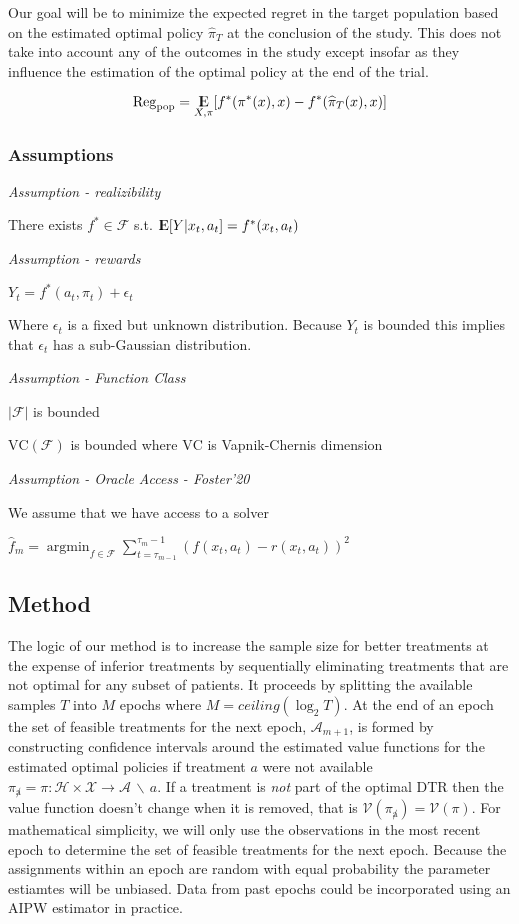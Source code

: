 \documentclass[12pt,,letterpaper,twoside]{report}
\DeclareMathOperator{\E}{{\rm I\kern-.3em E}}
\DeclareMathOperator*{\argmin}{argmin}
\begin{document}
Our goal will be to minimize the expected regret in the target
population based on the estimated optimal policy \(\widehat{\pi}_T\) at
the conclusion of the study. This does not take into account any of the
outcomes in the study except insofar as they influence the estimation of
the optimal policy at the end of the trial.

\[\mathrm{Reg}_{\text{pop}} = \E_{X, \pi}[f^*(\pi^*(x), x) - f^*(\widehat{\pi}_T(x), x)]\]

\hypertarget{assumptions}{%
\subsubsection{Assumptions}\label{assumptions}}

\emph{Assumption - realizibility}

There exists \(f^* \in \mathcal{F}\) s.t.
\(\E[Y | x_t, a_t] = f^*(x_t, a_t)\)

\emph{Assumption - rewards}

\(Y_t = f^*(a_t, \pi_t) + \epsilon_t\)

Where \(\epsilon_t\) is a fixed but unknown distribution. Because
\(Y_t\) is bounded this implies that \(\epsilon_t\) has a sub-Gaussian
distribution.

\emph{Assumption - Function Class}

\(|\mathcal{F}|\) is bounded

\(\mathrm{VC}(\mathcal{F})\) is bounded where \(\mathrm{VC}\) is
Vapnik-Chernis dimension

\emph{Assumption - Oracle Access - Foster'20}

We assume that we have access to a solver

\(\widehat{f}_m = \argmin_{f \in \mathcal{F}} \sum_{t = \tau_{m-1}}^{\tau_m - 1} \left(f(x_t, a_t) - r(x_t, a_t) \right)^2\)

\hypertarget{method}{%
\subsection{Method}\label{method}}

The logic of our method is to increase the sample size for better
treatments at the expense of inferior treatments by sequentially
eliminating treatments that are not optimal for any subset of patients.
It proceeds by splitting the available samples \(T\) into \(M\) epochs
where \(M = ceiling(\log_2{T})\). At the end of an epoch the set of
feasible treatments for the next epoch, \(\mathcal{A}_{m + 1}\), is
formed by constructing confidence intervals around the estimated value
functions for the estimated optimal policies if treatment \(a\) were not
available
\(\pi_{\not a} = \pi: \mathcal{H} \times \mathcal{X} \to \mathcal{A} \, \backslash \, a\).
If a treatment is \emph{not} part of the optimal DTR then the value
function doesn't change when it is removed, that is
\(\mathcal{V}(\pi_{\not a}) = \mathcal{V}(\pi)\). For mathematical
simplicity, we will only use the observations in the most recent epoch
to determine the set of feasible treatments for the next epoch. Because
the assignments within an epoch are random with equal probability the
parameter estiamtes will be unbiased. Data from past epochs could be
incorporated using an AIPW estimator in practice.
\end{document}
